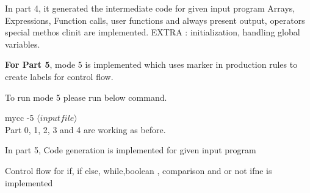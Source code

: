 \documentclass{article}
\begin{document}
In part 4, it generated the intermediate code for given input program
Arrays, Expressions, Function calls, user functions and always present output, operators
special methos clinit are implemented.
EXTRA :  initialization, handling global variables.

{ \bf  For Part 5}, mode 5 is implemented which uses marker in production rules to create labels for control flow. 

To run mode 5 please run below command.

mycc -5 $\langle input file\rangle$ \\

Part 0, 1, 2, 3 and 4 are working as before.

In part 5,  Code generation is implemented for given input program

Control flow for if, if else, while,boolean , comparison and or not ifne is implemented 
\end{document}
